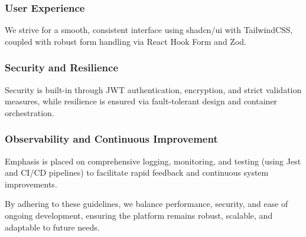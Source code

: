 \documentclass{FastFyp}
\begin{document}
\subsubsection{User Experience}
 
We strive for a smooth, consistent interface using shadcn/ui with TailwindCSS, coupled with robust form handling via React Hook Form and Zod.

 
\subsubsection{Security and Resilience}
Security is built-in through JWT authentication, encryption, and strict validation measures, while resilience is ensured via fault-tolerant design and container orchestration.

\subsubsection{Observability and Continuous Improvement}
Emphasis is placed on comprehensive logging, monitoring, and testing (using Jest and CI/CD pipelines) to facilitate rapid feedback and continuous system improvements.


By adhering to these guidelines, we balance performance, security, and ease of ongoing development, ensuring the platform remains robust, scalable, and adaptable to future needs.



\end{document}
